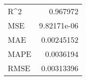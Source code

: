 \begin{tabular}{lr}
\hline
 R\^{}2  & 0.967972    \\
 MSE  & 9.82171e-06 \\
 MAE  & 0.00245152  \\
 MAPE & 0.0036194   \\
 RMSE & 0.00313396  \\
\hline
\end{tabular}